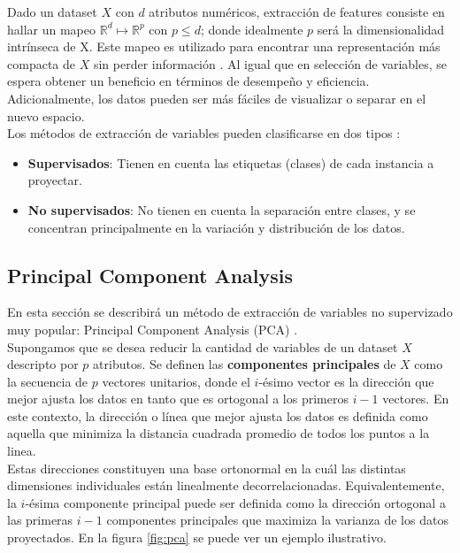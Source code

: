 Dado un dataset $X$ con $d$ atributos numéricos, extracción de features consiste en hallar un mapeo $\mathds{R}^d \mapsto \mathds{R}^p$ con $p \leq d$; donde idealmente $p$ será la dimensionalidad intrínseca de X. Este mapeo es utilizado para encontrar una representación más compacta de $X$ sin perder información \cite{fextraction}. Al igual que en selección de variables, se espera obtener un beneficio en términos de desempeño y eficiencia. Adicionalmente, los datos pueden ser más fáciles de visualizar o separar en el nuevo espacio. \\

Los métodos de extracción de variables pueden clasificarse en dos tipos \cite{fextraction}: 
\begin{itemize}
\item \textbf{Supervisados}: Tienen en cuenta las etiquetas (clases) de cada instancia a proyectar.
\item \textbf{No supervisados}: No tienen en cuenta la separación entre clases, y se concentran principalmente en la variación y distribución de los datos.
\end{itemize}

\subsection{Principal Component Analysis}

\label{PCA}

En esta sección se describirá un método de extracción de variables no supervizado muy popular: Principal Component Analysis (PCA) \cite{han2012mining}. \\

Supongamos que se desea reducir la cantidad de variables de un dataset $X$ descripto por $p$ atributos. Se definen las \textbf{componentes principales} de $X$ como la secuencia de $p$ vectores unitarios, donde el $i$-ésimo vector es la dirección que mejor ajusta los datos en tanto que es ortogonal a los primeros $i-1$ vectores. En este contexto, la dirección o línea que mejor ajusta los datos es definida como aquella que minimiza la distancia cuadrada promedio de todos los puntos a la linea. \\

Estas direcciones constituyen una base ortonormal en la cuál las distintas dimensiones individuales están linealmente decorrelacionadas.  Equivalentemente, la $i$-ésima componente principal puede ser definida como la dirección ortogonal a las primeras $i-1$ componentes principales que maximiza la varianza de los datos proyectados. En la figura \ref{fig:pca} se puede ver un ejemplo ilustrativo.  \\

